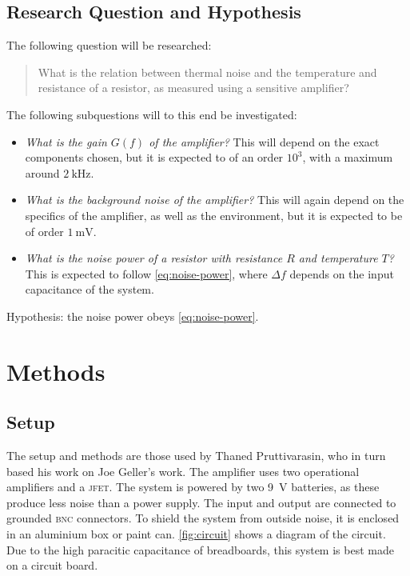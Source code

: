 \documentclass{article}
\begin{document}
\subsection{Research Question and Hypothesis}
The following question will be researched:
\begin{quote}
  What is the relation between thermal noise and the temperature and resistance of a resistor, as measured using a sensitive amplifier?
\end{quote}
The following subquestions will to this end be investigated:
\begin{itemize}
\item \textit{What is the gain $G(f)$ of the amplifier?}
  This will depend on the exact components chosen, but it is expected to of an order $10^3$, with a maximum around $\SI{2}{\kHz}$.
\item \textit{What is the background noise of the amplifier?}
  This will again depend on the specifics of the amplifier, as well as the environment, but it is expected to be of order $\SI{1}{\mV}$.
\item \textit{What is the noise power of a resistor with resistance $R$ and temperature $T$?}
  This is expected to follow \autoref{eq:noise-power}, where $\Delta f$ depends on the input capacitance of the system.
\end{itemize}
Hypothesis: the noise power obeys \autoref{eq:noise-power}.
\section{Methods}
\subsection{Setup}
The setup and methods are those used by Thaned Pruttivarasin\cite{pruttivarasin_robust_2018}, who in turn based his work on Joe Geller's work\cite{geller_build_2007}.
The amplifier uses two operational amplifiers and a \textsc{jfet}.
The system is powered by two \SI{9}{\V} batteries, as these produce less noise than a power supply.
The input and output are connected to grounded \textsc{bnc} connectors.
To shield the system from outside noise, it is enclosed in an aluminium box or paint can.
\autoref{fig:circuit} shows a diagram of the circuit.
Due to the high paracitic capacitance of breadboards, this system is best made on a circuit board.
\end{document}
